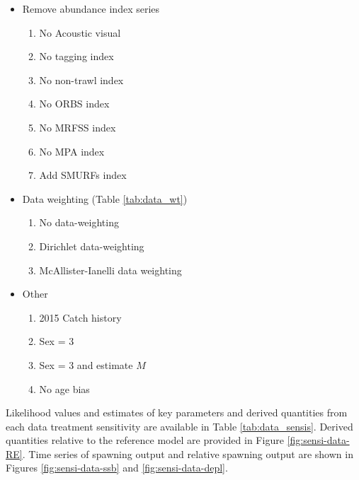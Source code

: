 \documentclass[11pt,
  letterpaper,
]{article}
\providecommand{\tightlist}{%
  \setlength{\itemsep}{0pt}\setlength{\parskip}{0pt}}
\providecommand{\tightlist}{%
  \setlength{\itemsep}{0pt}\setlength{\parskip}{0pt}}
\begin{document}
\begin{itemize}
\tightlist
\item
  Remove abundance index series

  \begin{enumerate}
  \def\labelenumi{\arabic{enumi}.}
  \tightlist
  \item
    No Acoustic visual
  \item
    No tagging index
  \item
    No non-trawl index
  \item
    No ORBS index
  \item
    No MRFSS index
  \item
    No MPA index
  \item
    Add SMURFs index
  \end{enumerate}
\item
  Data weighting (Table \ref{tab:data_wt})

  \begin{enumerate}
  \def\labelenumi{\arabic{enumi}.}
  \setcounter{enumi}{7}
  \tightlist
  \item
    No data-weighting
  \item
    Dirichlet data-weighting
  \item
    McAllister-Ianelli data weighting
  \end{enumerate}
\item
  Other

  \begin{enumerate}
  \def\labelenumi{\arabic{enumi}.}
  \setcounter{enumi}{10}
  \tightlist
  \item
    2015 Catch history
  \item
    Sex = 3
  \item
    Sex = 3 and estimate \(M\)
  \item
    No age bias
  \end{enumerate}
\end{itemize}

Likelihood values and estimates of key parameters and derived quantities from each data treatment sensitivity are available in Table \ref{tab:data_sensis}. Derived quantities relative to the reference model are provided in Figure \ref{fig:sensi-data-RE}. Time series of spawning output and relative spawning output are shown in Figures \ref{fig:sensi-data-ssb} and \ref{fig:sensi-data-depl}.
\end{document}
